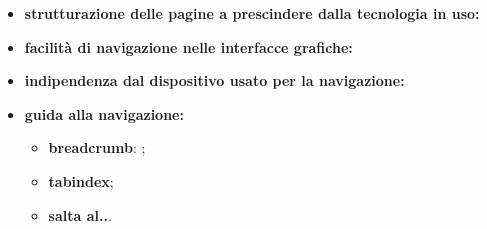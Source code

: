 \begin{itemize}
	\item \textbf{strutturazione delle pagine a prescindere dalla tecnologia in uso:}
	\item \textbf{facilità di navigazione nelle interfacce grafiche:}
	\item \textbf{indipendenza dal dispositivo usato per la navigazione:}
	\item \textbf{guida alla navigazione:}
	\begin{itemize}
		\item \textbf{breadcrumb}: ;
		\item \textbf{tabindex};
		\item \textbf{salta al..}.
	\end{itemize}
\end{itemize}
